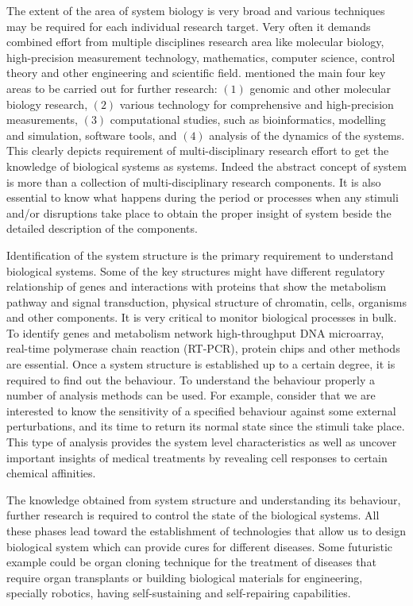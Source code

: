 The extent of the area of system biology is very broad and various techniques may be required for each individual research target. Very often it demands combined effort from multiple disciplines research area like molecular biology, high-precision measurement technology, mathematics, computer science, control theory and other engineering and scientific field. \cite{Kitano:2002} mentioned the main four key areas to be carried out for further research: $(1)$ genomic and other molecular biology research, $(2)$ various technology for comprehensive and high-precision measurements, $(3)$ computational studies, such as bioinformatics, modelling and simulation, software tools, and $(4)$ analysis of the dynamics of the systems. This clearly depicts requirement of multi-disciplinary research effort to get the knowledge of biological systems as systems. Indeed the abstract concept of system is more than a collection of multi-disciplinary research components. It is also essential to know what happens during the period or processes when any stimuli and/or disruptions take place to obtain the proper insight of system beside the detailed description of the components.

Identification of the system structure is the primary requirement to understand biological systems. Some of the key structures might have different regulatory relationship of genes and interactions with proteins that show the metabolism pathway and signal transduction, physical structure of chromatin, cells, organisms and other components. It is very critical to monitor biological processes in bulk. To identify genes and metabolism network high-throughput DNA microarray, real-time polymerase chain reaction (RT-PCR), protein chips and other methods are essential. Once a system structure is established up to a certain degree, it is required to find out the behaviour. To understand the behaviour properly a number of analysis methods can be used. For example, consider that we are interested to know the sensitivity of a specified behaviour against some external perturbations, and its time to return its normal state since the stimuli take place. This type of analysis provides the system level characteristics as well as uncover important insights of medical treatments by revealing cell responses to certain chemical affinities. 

The knowledge obtained from system structure and understanding its behaviour, further research is required to control the state of the biological systems. All these phases lead toward the establishment of technologies that allow us to design biological system which can provide cures for different diseases. Some futuristic example could be organ cloning technique for the treatment of diseases that require organ transplants or building biological materials for engineering, specially robotics, having self-sustaining and self-repairing capabilities.

